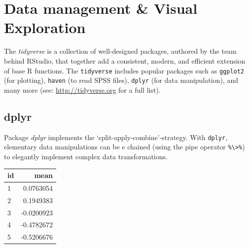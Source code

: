 \documentclass[]{book}
\newenvironment{Shaded}{\begin{snugshade}}{\end{snugshade}}
\newcommand{\KeywordTok}[1]{\textcolor[rgb]{0.13,0.29,0.53}{\textbf{#1}}}
\newcommand{\DataTypeTok}[1]{\textcolor[rgb]{0.13,0.29,0.53}{#1}}
\newcommand{\DecValTok}[1]{\textcolor[rgb]{0.00,0.00,0.81}{#1}}
\newcommand{\StringTok}[1]{\textcolor[rgb]{0.31,0.60,0.02}{#1}}
\newcommand{\CommentTok}[1]{\textcolor[rgb]{0.56,0.35,0.01}{\textit{#1}}}
\newcommand{\OperatorTok}[1]{\textcolor[rgb]{0.81,0.36,0.00}{\textbf{#1}}}
\newcommand{\NormalTok}[1]{#1}
\begin{document}
\section{Data management \& Visual
Exploration}\label{data-management-visual-exploration}


The \emph{tidyverse} is a collection of well-designed packages, authored
by the team behind RStudio, that together add a consistent, modern, and
efficient extension of base R functions. The \texttt{tidyverse} includes
popular packages such as \texttt{ggplot2} (for plotting), \texttt{haven}
(to read SPSS files), \texttt{dplyr} (for data manipulation), and many
more (see: \url{http://tidyverse.org} for a full list).

\subsection{dplyr}\label{dplyr}


Package \emph{dplyr} \citep{R-dplyr} implements the
`split-apply-combine'-strategy. With \texttt{dplyr}, elementary data
manipulations can be e chained (using the pipe operator
\texttt{\%\textbackslash{}\textgreater{}\%}) to elegantly implement
complex data transformations.

\begin{Shaded}
\end{Shaded}

\begin{tabular}{l|r}
\hline
id & mean\\
\hline
1 & 0.0763054\\
\hline
2 & 0.1949383\\
\hline
3 & -0.0200923\\
\hline
4 & -0.4782672\\
\hline
5 & -0.5206676\\
\hline
\end{tabular}
\end{document}
